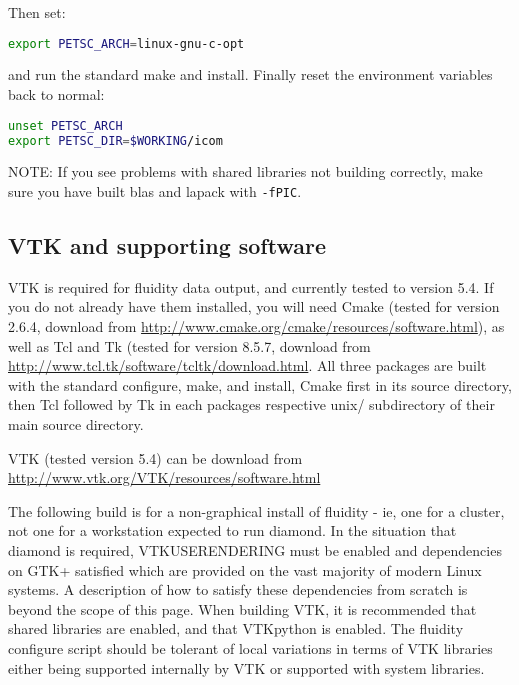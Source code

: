 Then set:

\begin{lstlisting}[language=bash]
export PETSC_ARCH=linux-gnu-c-opt
\end{lstlisting}

and run the standard make and install. Finally reset the environment variables
back to normal:

\begin{lstlisting}[language=bash]
unset PETSC_ARCH
export PETSC_DIR=$WORKING/icom
\end{lstlisting}

NOTE: If you see problems with shared libraries not building correctly, make
sure you have built blas and lapack with \lstinline[language=bash]+-fPIC+.

\subsection{VTK and supporting software}
\label{sect:required_libraries_vtk}

VTK is required for fluidity data output, and currently tested to version 5.4.
If you do not already have them installed, you will need Cmake (tested for
version 2.6.4, download from
\url{http://www.cmake.org/cmake/resources/software.html}), as well as Tcl and
Tk (tested for version 8.5.7, download from
\url{http://www.tcl.tk/software/tcltk/download.html}. All three packages are
built with the standard configure, make, and install, Cmake first in its source
directory, then Tcl followed by Tk in each packages respective unix/
subdirectory of their main source directory.

VTK (tested version 5.4) can be download from
\url{http://www.vtk.org/VTK/resources/software.html}

The following build is for a non-graphical install of fluidity - ie, one for a
cluster, not one for a workstation expected to run diamond. In the situation
that diamond is required, VTK{\textunderscore}USE{\textunderscore}RENDERING
must be enabled and dependencies on GTK+ satisfied which are provided on the
vast majority of modern Linux systems. A description of how to satisfy these
dependencies from scratch is beyond the scope of this page.  When building VTK,
it is recommended that shared libraries are enabled, and that VTKpython is
enabled. The fluidity configure script should be tolerant of local variations
in terms of VTK libraries either being supported internally by VTK or supported
with system libraries.

